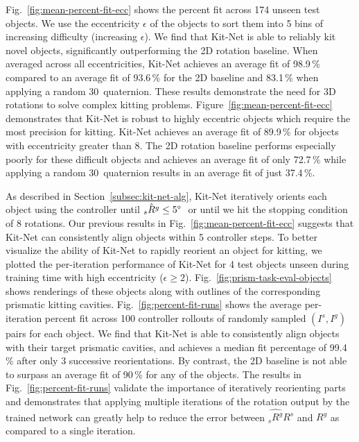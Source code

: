 Fig.~\ref{fig:mean-percent-fit-ecc} shows the percent fit across 174 unseen test objects. We use the eccentricity $\epsilon$ of the objects to sort them into 5 bins of increasing difficulty (increasing $\epsilon$). We find that Kit-Net is able to reliably kit novel objects, significantly outperforming the 2D rotation baseline. When averaged across all eccentricities, Kit-Net achieves an average fit of 98.9\,\% compared to an average fit of 93.6\,\% for the 2D baseline and 83.1\,\% when applying a random 30\degree~quaternion. These results demonstrate the need for 3D rotations to solve complex kitting problems. Figure~\ref{fig:mean-percent-fit-ecc} demonstrates that Kit-Net is robust to highly eccentric objects which require the most precision for kitting. Kit-Net achieves an average fit of 89.9\,\% for objects with eccentricity greater than 8. The 2D rotation baseline performs especially poorly for these difficult objects and achieves an average fit of only 72.7\,\% while applying a random 30\degree~quaternion results in an average fit of just 37.4\,\%.

As described in Section~\ref{subsec:kit-net-alg}, Kit-Net iteratively orients each object using the controller until $\hat{{_s}R^g}\leq 5\degree~$ or until we hit the stopping condition of 8 rotations. Our previous results in Fig.~\ref{fig:mean-percent-fit-ecc} suggests that Kit-Net can consistently align objects within 5 controller steps.
To better visualize the ability of Kit-Net to rapidly reorient an object for kitting, we plotted the per-iteration performance of Kit-Net for 4 test objects unseen during training time with high eccentricity ($\epsilon \geq 2$).  Fig.~\ref{fig:prism-task-eval-objects} shows renderings of these objects along with outlines of the corresponding prismatic kitting cavities. Fig.~\ref{fig:percent-fit-runs} shows the average per-iteration percent fit across 100 controller rollouts of randomly sampled $(I^s,I^g)$ pairs for each object. We find that Kit-Net is able to consistently align objects with their target prismatic cavities, and achieves a median fit percentage of 99.4\,\% after only 3 successive reorientations. By contrast, the 2D baseline is not able to surpass an average fit of 90\,\% for any of the objects. The results in Fig.~\ref{fig:percent-fit-runs} validate the importance of iteratively reorienting parts and demonstrates that applying multiple iterations of the rotation output by the trained network can greatly help to reduce the error between $\hat{{_s}R^g}R^s$ and $R^g$ as compared to a single iteration. 

